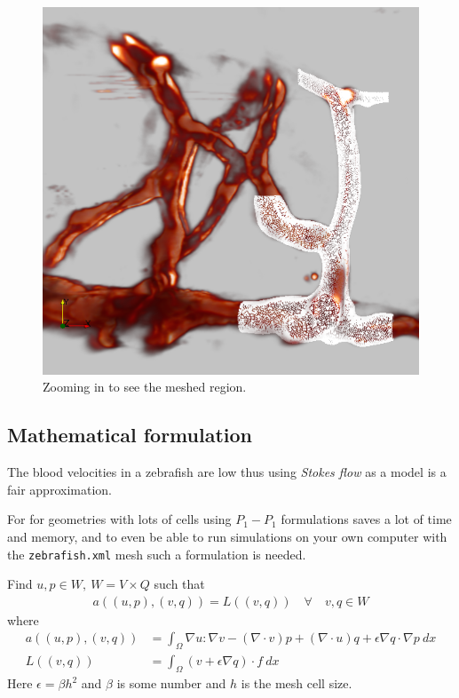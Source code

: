 \documentclass[epsfig,11pt]{article}
\begin{document}
\begin{figure}[h!] 
\begin{center}
  \includegraphics[scale=0.3]{zoomed2.png}
  \end{center}
  \caption{Zooming in to see the meshed region.}
\end{figure}


\subsection{Mathematical formulation}

The blood velocities in a zebrafish are low thus using \emph{Stokes flow} as a model is a fair approximation.

For for geometries with lots of cells using $P_1-P_1$ formulations saves a lot of time and memory, and to even be able to run simulations on your own computer with the \texttt{zebrafish.xml} mesh such a formulation is needed. 

Find $u,p \in W,\: W = V \times Q $ such that
\begin{align*}
a((u,p),(v,q)) = L((v,q)) \quad \forall \quad v,q \in W 
\end{align*}
where
\begin{align*}
a((u,p),(v,q)) &= \int_\Omega \nabla u : \nabla v - (\nabla \cdot v)p + (\nabla \cdot u)q + \epsilon \nabla q \cdot \nabla p \: dx \\
L((v,q)) &= \int_\Omega  (v + \epsilon \nabla q) \cdot f \: dx
\end{align*}
Here \(\epsilon = \beta h^2\) and \(\beta\) is some number and \(h\) is the mesh cell size.
\end{document}
